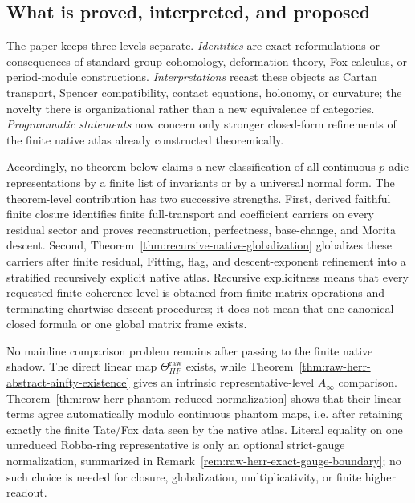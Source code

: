 \documentclass[11pt]{article}
\theoremstyle{definition}
\begin{document}
\subsection{What is proved, interpreted, and proposed}

The paper keeps three levels separate.  \emph{Identities} are exact reformulations or consequences of standard group cohomology, deformation theory, Fox calculus, or period-module constructions.  \emph{Interpretations} recast these objects as Cartan transport, Spencer compatibility, contact equations, holonomy, or curvature; the novelty there is organizational rather than a new equivalence of categories.  \emph{Programmatic statements} now concern only stronger closed-form refinements of the finite native atlas already constructed theoremically.

Accordingly, no theorem below claims a new classification of all continuous $p$-adic representations by a finite list of invariants or by a universal normal form.  The theorem-level contribution has two successive strengths.  First, derived faithful finite closure identifies finite full-transport and coefficient carriers on every residual sector and proves reconstruction, perfectness, base-change, and Morita descent.  Second, Theorem~\ref{thm:recursive-native-globalization} globalizes these carriers after finite residual, Fitting, flag, and descent-exponent refinement into a stratified recursively explicit native atlas.  Recursive explicitness means that every requested finite coherence level is obtained from finite matrix operations and terminating chartwise descent procedures; it does not mean that one canonical closed formula or one global matrix frame exists.

No mainline comparison problem remains after passing to the finite native shadow.  The direct linear map $\Theta_{HF}^{\mathrm{raw}}$ exists, while Theorem~\ref{thm:raw-herr-abstract-ainfty-existence} gives an intrinsic representative-level $A_\infty$ comparison.  Theorem~\ref{thm:raw-herr-phantom-reduced-normalization} shows that their linear terms agree automatically modulo continuous phantom maps, i.e. after retaining exactly the finite Tate/Fox data seen by the native atlas.  Literal equality on one unreduced Robba-ring representative is only an optional strict-gauge normalization, summarized in Remark~\ref{rem:raw-herr-exact-gauge-boundary}; no such choice is needed for closure, globalization, multiplicativity, or finite higher readout.
\end{document}
